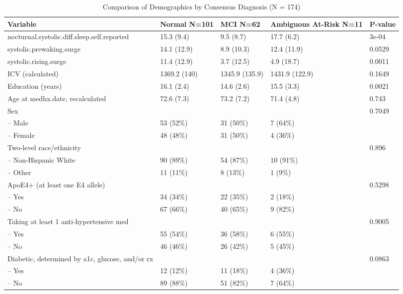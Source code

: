 \documentclass[10pt]{article}\usepackage[]{graphicx}\usepackage[]{color}
\begin{document}
\begin{table}[ht]
\centering
\caption{Comparison of Demographics by Consensus Diagnosis (N = 174)} 
\begin{tabular}{lllll}
  \toprule
Variable & \parbox{.5in}{Normal N=101} & \parbox{.41in}{MCI    N=62} & \parbox{.61in}{Ambiguous At-Risk      N=11} & P-value \\ 
  \midrule
nocturnal.systolic.diff.sleep.self.reported & 15.3 (9.4) & 9.5 (8.7) & 17.7 (6.2) & 3e-04 \\ 
  systolic.prewaking.surge & 14.1 (12.9) & 8.9 (10.3) & 12.4 (11.9) & 0.0529 \\ 
  systolic.rising.surge & 11.4 (12.9) & 3.7 (12.5) & 4.9 (18.7) & 0.0011 \\ 
  ICV (calculated) & 1369.2 (140) & 1345.9 (135.9) & 1431.9 (122.9) & 0.1649 \\ 
  Education (years) & 16.1 (2.4) & 14.6 (2.6) & 15.5 (3.3) & 0.0021 \\ 
  Age at medhx.date, recalculated & 72.6 (7.3) & 73.2 (7.2) & 71.4 (4.8) & 0.743 \\ 
  Sex &  &  &  & 0.7049 \\ 
  -- Male & 53 (52\%) & 31 (50\%) & 7 (64\%) &  \\ 
  -- Female & 48 (48\%) & 31 (50\%) & 4 (36\%) &  \\ 
  Two-level race/ethnicity &  &  &  & 0.896 \\ 
  -- Non-Hispanic White & 90 (89\%) & 54 (87\%) & 10 (91\%) &  \\ 
  -- Other & 11 (11\%) & 8 (13\%) & 1 (9\%) &  \\ 
  ApoE4+ (at least one E4 allele) &  &  &  & 0.5298 \\ 
  -- Yes & 34 (34\%) & 22 (35\%) & 2 (18\%) &  \\ 
  -- No & 67 (66\%) & 40 (65\%) & 9 (82\%) &  \\ 
  Taking at least 1 anti-hypertensive med &  &  &  & 0.9005 \\ 
  -- Yes & 55 (54\%) & 36 (58\%) & 6 (55\%) &  \\ 
  -- No & 46 (46\%) & 26 (42\%) & 5 (45\%) &  \\ 
  Diabetic, determined by a1c, glucose, and/or rx &  &  &  & 0.0863 \\ 
  -- Yes & 12 (12\%) & 11 (18\%) & 4 (36\%) &  \\ 
  -- No & 89 (88\%) & 51 (82\%) & 7 (64\%) &  \\ 

\end{tabular}
\end{table}
\end{document}
